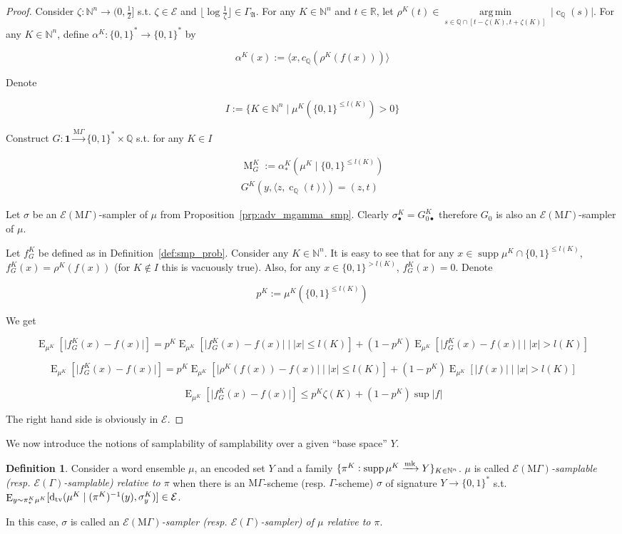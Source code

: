 \documentclass{article}
\numberwithin{equation}{section}
\theoremstyle{definition}
\newtheorem{definition}{Definition}[section]
\theoremstyle{plain}
\newcommand{\Bool}{\{0,1\}}
\newcommand{\Words}{{\Bool^*}}
\DeclareMathOperator{\Supp}{supp}
\DeclareMathOperator{\E}{E}
\DeclareMathOperator{\M}{M}
\DeclareMathOperator{\En}{c}
\newcommand{\Dtv}{\operatorname{d}_{\textnormal{tv}}}
\newcommand{\Argmin}[1]{\underset{#1}{\operatorname{arg\,min}}\,}
\newcommand{\Nats}{\mathbb{N}}
\newcommand{\Rats}{\mathbb{Q}}
\newcommand{\Reals}{\mathbb{R}}
\newcommand{\NatFun}{\Nats^n \rightarrow}
\newcommand{\Abs}[1]{\lvert #1 \rvert}
\newcommand{\Floor}[1]{\lfloor #1 \rfloor}
\newcommand{\Chev}[1]{\langle #1 \rangle}
\newcommand{\GrowA}{\Gamma_{\mathfrak{A}}}
\newcommand{\MGrow}{\mathrm{M}\Gamma}
\newcommand{\Fall}{\mathcal{E}}
\newcommand{\EG}{\Fall(\Gamma)}
\newcommand{\EMG}{\Fall(\MGrow)}
\newcommand{\Markov}{\xrightarrow{\textnormal{mk}}}
\newcommand{\MScheme}{\xrightarrow{\MGrow}}
\begin{document}
\begin{proof}

Consider $\zeta: \NatFun (0,\frac{1}{2}]$ s.t.  $\zeta \in \Fall$ and $\Floor{\log \frac{1}{\zeta}} \in \GrowA$. For any $K \in \Nats^n$ and ${t \in \Reals}$, let ${\rho^K(t) \in \Argmin{s \in \Rats \cap [t-\zeta(K),t+\zeta(K)]} \Abs{\En_\Rats(s)}}$. For any $K \in \Nats^n$, define ${\alpha^K: \Words \rightarrow \Words}$ by 

\[\alpha^K(x):=\Chev{x,c_\Rats(\rho^K(f(x)))}\]

Denote 

\[I:=\{K \in \Nats^n \mid \mu^{K}(\Bool^{\leq l(K)}) > 0\}\]

Construct ${G: \bm{1} \MScheme \Words \times \Rats}$ s.t. for any $K \in I$

\begin{align*}
\M_G^K:=\alpha_*^K(\mu^{K} \mid \Bool^{\leq l(K)}) \\
G^K(y,\Chev{z,\En_\Rats(t)})=(z,t)
\end{align*}

Let $\sigma$ be an $\EMG$-sampler of $\mu$ from Proposition~\ref{prp:adv_mgamma_smp}. Clearly $\sigma_{\bullet}^K=G_{0\bullet}^K$ therefore $G_0$ is also an $\EMG$-sampler of $\mu$.

Let ${f_G^K}$ be defined as in Definition~\ref{def:smp_prob}. Consider any $K \in \Nats^n$. It is easy to see that for any ${x \in \Supp \mu^{K} \cap \Bool^{\leq l(K)}}$, ${f_G^K(x)=\rho^K(f(x))}$ (for $K \not\in I$ this is vacuously true). Also, for any ${x \in \Bool^{>l(K)}}$, $f_G^K(x)=0$. Denote 

\[p^K:=\mu^{K}(\Bool^{\leq l(K)})\]

We get

$$\E_{\mu^{K}}[\Abs{f_G^K(x)-f(x)}]=p^K \E_{\mu^{K}}[\Abs{f_G^K(x)-f(x)} \mid \Abs{x} \leq l(K)] + (1 - p^K)\E_{\mu^{K}}[\Abs{f_G^K(x)-f(x)} \mid \Abs{x} > l(K)]$$

$$\E_{\mu^{K}}[\Abs{f_G^K(x)-f(x)}]=p^K \E_{\mu^{K}}[\Abs{\rho^K(f(x))-f(x)} \mid \Abs{x} \leq l(K)] + (1 - p^K)\E_{\mu^{K}}[\Abs{f(x)} \mid \Abs{x} > l(K)]$$

$$\E_{\mu^{K}}[\Abs{f_G^K(x)-f(x)}] \leq p^K \zeta(K) + (1 - p^K)\sup \Abs{f}$$

The right hand side is obviously in $\Fall$.
\end{proof}

We now introduce the notions of samplability of samplability over a given \enquote{base space} $Y$.

\begin{definition}

Consider a word ensemble $\mu$, an encoded set $Y$ and a family ${\{\pi^K: \Supp \mu^{K} \Markov Y\}_{K \in \Nats^n}}$. $\mu$ is called \emph{$\EMG$-samplable (resp. $\EG$-samplable) relative to $\pi$} when there is an $\MGrow$-scheme (resp. $\Gamma$-scheme) $\sigma$ of signature $Y \rightarrow \Words$ s.t. ${\E_{y \sim \pi_*^K\mu^{K}}[\Dtv(\mu^K \mid (\pi^K)^{-1}(y),\sigma_y^K)] \in \Fall}$.

In this case, $\sigma$ is called an \emph{$\EMG$-sampler (resp. $\EG$-sampler) of $\mu$ relative to $\pi$}.

\end{definition}
\end{document}
